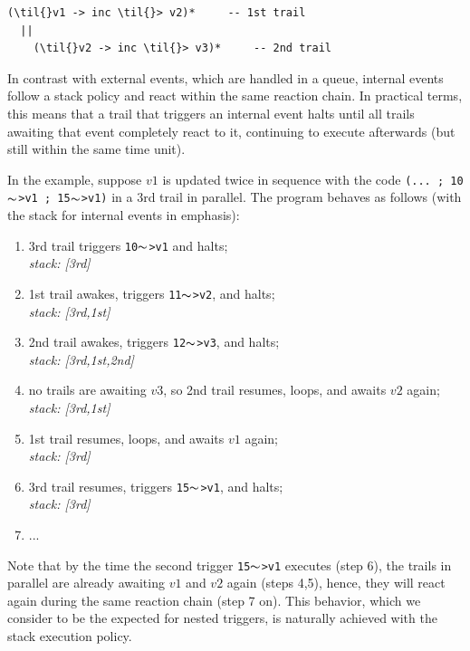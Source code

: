 \documentclass{sig-alternate-ipsn09}
\newcommand{\2}{\;\;}
\newcommand{\5}{\;\;\;\;\;}
\newcommand{\til}{$\thicksim$}
\newcommand{\code}[1] {{\small{\texttt{#1}}}}
\begin{document}
\begin{Verbatim}[commandchars=\\\{\}]
    (\til{}v1 -> inc \til{}> v2)*     -- 1st trail
  ||
    (\til{}v2 -> inc \til{}> v3)*     -- 2nd trail
\end{Verbatim}

In contrast with external events, which are handled in a queue, internal events 
follow a stack policy and react within the same reaction chain.
In practical terms, this means that a trail that triggers an internal event 
halts until all trails awaiting that event completely react to it, continuing 
to execute afterwards (but still within the same time unit).

In the example, suppose $v1$ is updated twice in sequence with the code
\code{(...~;~10\til{}>v1~;~15\til{}>v1)} in a 3rd trail in parallel.
The program behaves as follows (with the stack for internal events in 
emphasis):

\begin{enumerate}
\setlength{\itemsep}{0pt}
\item 3rd trail triggers \code{10\til{}>v1} and halts;\\
    \emph{stack: [3rd]}
\item 1st trail awakes, triggers \code{11\til{}>v2}, and halts;\\
    \emph{stack: [3rd,1st]}
\item 2nd trail awakes, triggers \code{12\til{}>v3}, and halts;\\
    \emph{stack: [3rd,1st,2nd]}
\item no trails are awaiting $v3$, so 2nd trail resumes, loops, and awaits $v2$ 
    again;\\
    \emph{stack: [3rd,1st]}
\item 1st trail resumes, loops, and awaits $v1$ again;\\
    \emph{stack: [3rd]}
\item 3rd trail resumes, triggers \code{15\til{}>v1}, and halts;\\
    \emph{stack: [3rd]}
\item ...
\end{enumerate}

Note that by the time the second trigger \code{15\til{}>v1} executes (step 6), 
the trails in parallel are already awaiting $v1$ and $v2$ again (steps 4,5), 
hence, they will react again during the same reaction chain (step 7 on).
This behavior, which we consider to be the expected for nested triggers, is 
naturally achieved with the stack execution policy.
\end{document}
